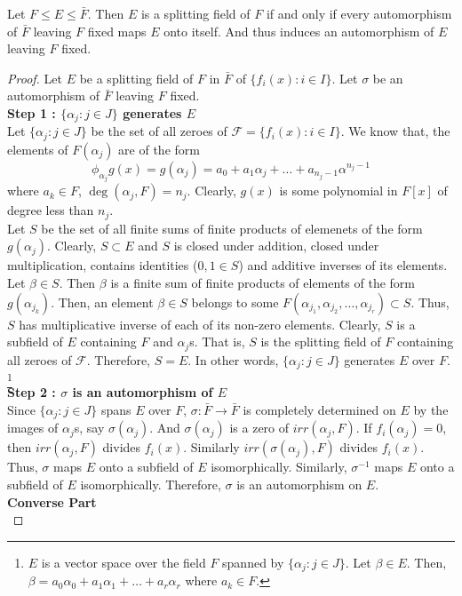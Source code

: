 \begin{theorem}
	Let $F \le E \le \bar{F}$.
	Then $E$ is a splitting field of $F$ if and only if every automorphism of $\bar{F}$ leaving $F$ fixed maps $E$ onto itself.
	And thus induces an automorphism of $E$ leaving $F$ fixed.
\end{theorem}
\begin{proof}
	Let $E$ be a splitting field of $F$ in $\bar{F}$ of $\{ f_i(x) : i \in I \}$.
	Let $\sigma$ be an automorphism of $\bar{F}$ leaving $F$ fixed.\\

	\textbf{Step 1 : $\{ \alpha_j : j \in J \}$ generates $E$}\\
	Let $\{ \alpha_j : j \in J\}$ be the set of all zeroes of $\mathscr{F} = \{ f_i(x) : i \in I\}$.
	We know that, the elements of  $F(\alpha_j)$ are of the form
	\[ \phi_{\alpha_j} g(x) = g(\alpha_j) =  a_0 + a_1 \alpha_j + \dots + a_{n_j-1}\alpha^{n_j-1} \]
	where $a_k \in F$, $\deg(\alpha_j,F) = n_j$.
	Clearly, $g(x)$ is some polynomial in $F[x]$ of degree less than $n_j$.\\

	Let $S$ be the set of all finite sums of finite products of elemenets of the form $g(\alpha_j)$.
	Clearly, $S \subset E$ and $S$ is closed under addition, closed under multiplication, contains identities ($0, 1 \in S$) and additive inverses of its elements.\\

	Let $\beta \in S$.
	Then $\beta$ is a finite sum of finite products of elements of the form $g(\alpha_{j_k})$.
	Then, an element $\beta \in S$ belongs to some $F(\alpha_{j_1},\alpha_{j_2},\dots,\alpha_{j_r}) \subset S$.
	Thus, $S$ has multiplicative inverse of each of its non-zero elements.
	Clearly, $S$ is a subfield of $E$ containing $F$ and $\alpha_j$s.
	That is, $S$ is the splitting field of $F$ containing all zeroes of $\mathscr{F}$.
	Therefore, $S = E$.
	In other words, $\{ \alpha_j : j \in J \}$ generates $E$ over $F$.
	\dag\footnote{$E$ is a vector space over the field $F$ spanned by $\{ \alpha_j : j \in J \}$. 
	Let $\beta \in E$.
	Then, $\beta = a_0 \alpha_0 + a_1 \alpha_1 + \dots + a_r \alpha_r$ where $a_k \in F$.}\\

	\textbf{Step 2 : $\sigma$ is an automorphism of $E$}\\
	Since $\{ \alpha_j : j \in J \}$ spans $E$ over $F$, $\sigma : \bar{F} \to \bar{F}$ is completely determined on $E$ by the images of $\alpha_j$s, say $\sigma(\alpha_j)$.
	And $\sigma(\alpha_j)$ is a zero of $irr(\alpha_j,F)$.
	If $f_i(\alpha_j) = 0$, then $irr(\alpha_j,F)$ divides $f_i(x)$.
	Similarly $irr(\sigma(\alpha_j),F)$ divides $f_i(x)$.
	Thus, $\sigma$ maps $E$ onto a subfield of $E$ isomorphically.
	Similarly, $\sigma^{-1}$ maps $E$ onto a subfield of $E$ isomorphically.
	Therefore, $\sigma$ is an automorphism on $E$.\\

	\textbf{Converse Part}\\

\end{proof}

